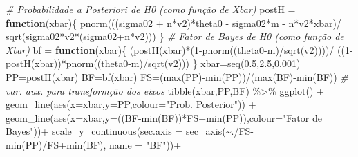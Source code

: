 \documentclass[
]{book}
\newenvironment{Shaded}{\begin{snugshade}}{\end{snugshade}}
\newcommand{\AttributeTok}[1]{\textcolor[rgb]{0.77,0.63,0.00}{#1}}
\newcommand{\CommentTok}[1]{\textcolor[rgb]{0.56,0.35,0.01}{\textit{#1}}}
\newcommand{\ControlFlowTok}[1]{\textcolor[rgb]{0.13,0.29,0.53}{\textbf{#1}}}
\newcommand{\DecValTok}[1]{\textcolor[rgb]{0.00,0.00,0.81}{#1}}
\newcommand{\FloatTok}[1]{\textcolor[rgb]{0.00,0.00,0.81}{#1}}
\newcommand{\FunctionTok}[1]{\textcolor[rgb]{0.00,0.00,0.00}{#1}}
\newcommand{\NormalTok}[1]{#1}
\newcommand{\OtherTok}[1]{\textcolor[rgb]{0.56,0.35,0.01}{#1}}
\newcommand{\SpecialCharTok}[1]{\textcolor[rgb]{0.00,0.00,0.00}{#1}}
\newcommand{\StringTok}[1]{\textcolor[rgb]{0.31,0.60,0.02}{#1}}
\begin{document}
\begin{Shaded}
\begin{Highlighting}[]
\CommentTok{\# Probabilidade a Posteriori de H0 (como função de Xbar)}
\NormalTok{postH }\OtherTok{=} \ControlFlowTok{function}\NormalTok{(xbar)\{}
  \FunctionTok{pnorm}\NormalTok{(((sigma02 }\SpecialCharTok{+}\NormalTok{ n}\SpecialCharTok{*}\NormalTok{v2)}\SpecialCharTok{*}\NormalTok{theta0 }\SpecialCharTok{{-}}\NormalTok{ sigma02}\SpecialCharTok{*}\NormalTok{m }\SpecialCharTok{{-}}\NormalTok{ n}\SpecialCharTok{*}\NormalTok{v2}\SpecialCharTok{*}\NormalTok{xbar)}\SpecialCharTok{/} \FunctionTok{sqrt}\NormalTok{(sigma02}\SpecialCharTok{*}\NormalTok{v2}\SpecialCharTok{*}\NormalTok{(sigma02}\SpecialCharTok{+}\NormalTok{n}\SpecialCharTok{*}\NormalTok{v2))) \}}
\CommentTok{\# Fator de Bayes de H0 (como função de Xbar)}
\NormalTok{bf }\OtherTok{=} \ControlFlowTok{function}\NormalTok{(xbar)\{}
\NormalTok{  (}\FunctionTok{postH}\NormalTok{(xbar)}\SpecialCharTok{*}\NormalTok{(}\DecValTok{1}\SpecialCharTok{{-}}\FunctionTok{pnorm}\NormalTok{((theta0}\SpecialCharTok{{-}}\NormalTok{m)}\SpecialCharTok{/}\FunctionTok{sqrt}\NormalTok{(v2))))}\SpecialCharTok{/}\NormalTok{ ((}\DecValTok{1}\SpecialCharTok{{-}}\FunctionTok{postH}\NormalTok{(xbar))}\SpecialCharTok{*}\FunctionTok{pnorm}\NormalTok{((theta0}\SpecialCharTok{{-}}\NormalTok{m)}\SpecialCharTok{/}\FunctionTok{sqrt}\NormalTok{(v2))) \}}
\NormalTok{xbar}\OtherTok{=}\FunctionTok{seq}\NormalTok{(}\FloatTok{0.5}\NormalTok{,}\FloatTok{2.5}\NormalTok{,}\FloatTok{0.001}\NormalTok{)}
\NormalTok{PP}\OtherTok{=}\FunctionTok{postH}\NormalTok{(xbar)}
\NormalTok{BF}\OtherTok{=}\FunctionTok{bf}\NormalTok{(xbar)}
\NormalTok{FS}\OtherTok{=}\NormalTok{(}\FunctionTok{max}\NormalTok{(PP)}\SpecialCharTok{{-}}\FunctionTok{min}\NormalTok{(PP))}\SpecialCharTok{/}\NormalTok{(}\FunctionTok{max}\NormalTok{(BF)}\SpecialCharTok{{-}}\FunctionTok{min}\NormalTok{(BF)) }\CommentTok{\# var. aux. para transformção dos eixos}
\FunctionTok{tibble}\NormalTok{(xbar,PP,BF) }\SpecialCharTok{\%\textgreater{}\%}
  \FunctionTok{ggplot}\NormalTok{() }\SpecialCharTok{+}
    \FunctionTok{geom\_line}\NormalTok{(}\FunctionTok{aes}\NormalTok{(}\AttributeTok{x=}\NormalTok{xbar,}\AttributeTok{y=}\NormalTok{PP,}\AttributeTok{colour=}\StringTok{"Prob. Posterior"}\NormalTok{)) }\SpecialCharTok{+}
    \FunctionTok{geom\_line}\NormalTok{(}\FunctionTok{aes}\NormalTok{(}\AttributeTok{x=}\NormalTok{xbar,}\AttributeTok{y=}\NormalTok{((BF}\SpecialCharTok{{-}}\FunctionTok{min}\NormalTok{(BF))}\SpecialCharTok{*}\NormalTok{FS}\SpecialCharTok{+}\FunctionTok{min}\NormalTok{(PP)),}\AttributeTok{colour=}\StringTok{"Fator de Bayes"}\NormalTok{))}\SpecialCharTok{+}
    \FunctionTok{scale\_y\_continuous}\NormalTok{(}\AttributeTok{sec.axis =} \FunctionTok{sec\_axis}\NormalTok{(}\SpecialCharTok{\textasciitilde{}}\NormalTok{.}\SpecialCharTok{/}\NormalTok{FS}\SpecialCharTok{{-}}\FunctionTok{min}\NormalTok{(PP)}\SpecialCharTok{/}\NormalTok{FS}\SpecialCharTok{+}\FunctionTok{min}\NormalTok{(BF), }\AttributeTok{name =} \StringTok{"BF"}\NormalTok{))}\SpecialCharTok{+}

\end{Highlighting}
\end{Shaded}
\end{document}
